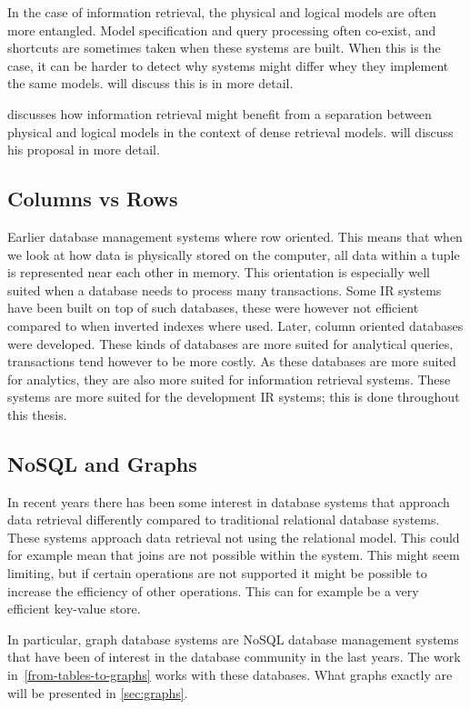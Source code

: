 In the case of information retrieval, the physical and logical models are often more entangled. Model specification and query processing often co-exist, and shortcuts are sometimes taken when these systems are built. When this is the case, it can be harder to detect why systems might differ whey they implement the same models.  will discuss this is in more detail. 

\citet{seperation-logical-physical} discusses how information retrieval might benefit from a separation between physical and logical models in the context of dense retrieval models.  will discuss his proposal in more detail.

\subsection{Columns vs Rows}
Earlier database management systems where row oriented. This means that when we look at how data is physically stored on the computer, all data within a tuple is represented near each other in memory. This orientation is especially well suited when a database needs to process many transactions. Some IR systems have been built on top of such databases, these were however not efficient compared to when inverted indexes where used. Later, column oriented databases were developed. These kinds of databases are more suited for analytical queries, transactions tend however to be more costly. As these databases are more suited for analytics, they are also more suited for information retrieval systems. These systems are more suited for the development IR systems; this is done throughout this thesis. 

\subsection{NoSQL and Graphs}
\label{sec:nosqlgraph}
In recent years there has been some interest in database systems that approach data retrieval differently compared to traditional relational database systems. These systems approach data retrieval not using the relational model. This could for example mean that joins are not possible within the system. This might seem limiting, but if certain operations are not supported it might be possible to increase the efficiency of other operations. This can for example be a very efficient key-value store. 

In particular, graph database systems are NoSQL database management systems that have been of interest in the database community in the last years. The work in~\cref{from-tables-to-graphs} works with these databases. What graphs exactly are will be presented in \cref{sec:graphs}.

